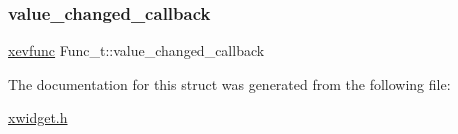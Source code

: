 \mbox{\label{structFunc__t_acce396ccf3266886f0a6d28cf45761d3}} 
\subsubsection{\texorpdfstring{value\+\_\+changed\+\_\+callback}{value\_changed\_callback}}
{\footnotesize\ttfamily \hyperlink{xwidget_8h_a9ef0263424a7f5f8f6b02055fca67ddd}{xevfunc} Func\+\_\+t\+::value\+\_\+changed\+\_\+callback}



The documentation for this struct was generated from the following file\+:\begin{DoxyCompactItemize}
\item 
\hyperlink{xwidget_8h}{xwidget.\+h}\end{DoxyCompactItemize}
